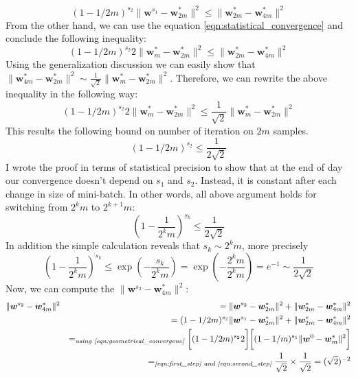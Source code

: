 \documentclass[11pt, a4paper, reqno, twoside]{scrartcl}
\theoremstyle{style}
\newcommand{\wv}{\bm{w}}
\newcommand{\0}{\mathbf{0}} %
\begin{document}
\begin{equation}
   (1-1/2m)^{s_2} \| \wv^{s_1} - \wv^*_{2m} \|^2 \leq \| \wv_{2m}^* - \wv_{4m}^*
   \|^2 \nonumber
\end{equation}
From the other hand, we can use the equation \ref{eqn:statistical_convergence}
and conclude the following inequality: 
\begin{equation}
	(1-1/2m)^{s_2} 2 \| \wv_m^* - \wv_{2m}^* \|^2 \leq \| \wv_{2m}^* - \wv_{4m}^*
   \|^2 \nonumber
\end{equation}
Using the generalization discussion we can easily show that $\| \wv_{4m}^* -
\wv_{2m}^* \|^2 \sim \frac{1}{\sqrt{2}} \|\wv_{m}^* - \wv_{2m}^* \|^2 $.
Therefore, we can rewrite the above inequality in the following way: 
\begin{equation}
(1-1/2m)^{s_2} 2 \| \wv_m^* - \wv_{2m}^* \|^2 \leq \frac{1}{\sqrt{2}} \| \wv_m^*
- \wv_{2m}^* \|^2 \nonumber
\end{equation}
This results the following bound on number of iteration on $2m$ samples. 
\begin{equation}
	(1-1/2m)^{s_2} \leq \frac{1}{2 \sqrt{2}} \label{eqn:second_step}
\end{equation}
I wrote the proof in terms of statistical precision to show that at the end of
day our convergence doesn't depend on $s_1$ and $s_2$. Instead, it is constant
after each change in size of mini-batch. In other words, all above argument
holds for switching from $2^k m$ to $2^{k+1} m$: 
\begin{equation}
	(1-\frac{1}{2^k m})^{s_k} \leq \frac{1}{2\sqrt{2}}
\end{equation}
In addition the simple calculation reveals that $s_k \sim 2^k m$, more precisely
\[
(1-\frac{1}{2^k m})^{s_k} \leq \exp(-\frac{s_k}{2^k m}) = \exp(-\frac{2^k m}{2^k
m}) = e^{-1} \sim \frac{1}{2\sqrt{2}} \] 
Now, we can
compute the $\|\wv^{s_2} - \wv_{4m}^*\|^2$:
\begin{eqnarray*}
	& \|\wv^{s_2} - \wv_{4m}^*\|^2 & = \|\wv^{s_2} - \wv_{2m}^*\|^2 +
	\|\wv^{*}_{2m} - \wv_{4m}^*\|^2 \\ 
	& &  = (1-1/2m)^{s_2} \| \wv^{s_1} - \wv^*_{2m} \|^2 + \|\wv^{*}_{2m} -
	\wv_{4m}^*\|^2 \\ 
	& & =_{\textit{using \ref{eqn:geometrical_convergenc}}} \bigg[ (1-1/2m)^{s_2}
	2\bigg] \bigg[(1-1/m)^{s_1} \|\wv^0 - \wv_m^*\|^2 \bigg] \\
	& & =_{\textit{\ref{eqn:first_step} and \ref{eqn:second_step}}}
	\frac{1}{\sqrt{2}} \times \frac{1}{\sqrt{2}} = (\sqrt{2})^{-2}
\end{eqnarray*}
\end{document}
